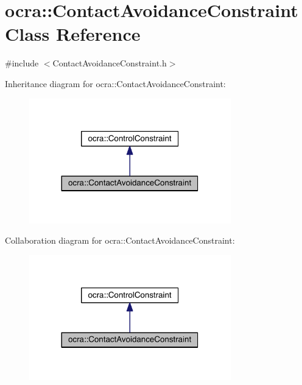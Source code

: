 \hypertarget{classocra_1_1ContactAvoidanceConstraint}{}\section{ocra\+:\+:Contact\+Avoidance\+Constraint Class Reference}
\label{classocra_1_1ContactAvoidanceConstraint}


{\ttfamily \#include $<$Contact\+Avoidance\+Constraint.\+h$>$}



Inheritance diagram for ocra\+:\+:Contact\+Avoidance\+Constraint\+:\nopagebreak
\begin{figure}[H]
\begin{center}
\leavevmode
\includegraphics[width=248pt]{d7/d74/classocra_1_1ContactAvoidanceConstraint__inherit__graph}
\end{center}
\end{figure}


Collaboration diagram for ocra\+:\+:Contact\+Avoidance\+Constraint\+:\nopagebreak
\begin{figure}[H]
\begin{center}
\leavevmode
\includegraphics[width=248pt]{d6/dcb/classocra_1_1ContactAvoidanceConstraint__coll__graph}
\end{center}
\end{figure}
